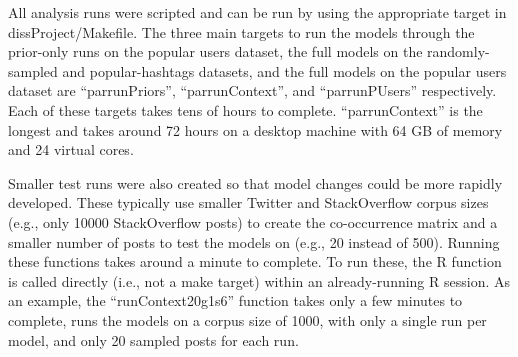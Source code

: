 \documentclass[man,floatsintext,donotrepeattitle]{apa6}
\begin{document}
All analysis runs were scripted and can be run by using the appropriate target in dissProject/Makefile.
The three main targets to run the models through the prior-only runs on the popular users dataset,
the full models on the randomly-sampled and popular-hashtags datasets,
and the full models on the popular users dataset are ``parrunPriors'', ``parrunContext'', and ``parrunPUsers'' respectively.
Each of these targets takes tens of hours to complete.
``parrunContext'' is the longest and takes around 72 hours on a desktop machine with 64 GB of memory and 24 virtual cores.

Smaller test runs were also created so that model changes could be more rapidly developed.
These typically use smaller Twitter and StackOverflow corpus sizes (e.g., only \num{10000} StackOverflow posts) to create the co-occurrence matrix
and a smaller number of posts to test the models on (e.g., 20 instead of 500).
Running these functions takes around a minute to complete.
To run these, the R function is called directly (i.e., not a make target) within an already-running R session.
As an example, the ``runContext20g1s6'' function takes only a few minutes to complete, runs the models on a corpus size of \num{1000}, with only a single run per model, and only 20 sampled posts for each run.
\end{document}
